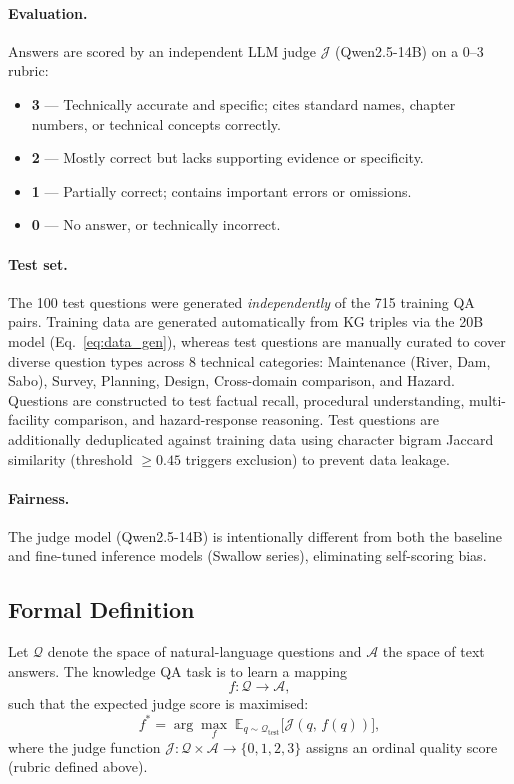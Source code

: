 \documentclass[twocolumn]{article}
\begin{document}
\paragraph{Evaluation.}
Answers are scored by an independent LLM judge $\mathcal{J}$ (Qwen2.5-14B) on a 0--3 rubric:
\begin{itemize}
  \item \textbf{3} --- Technically accurate and specific; cites standard names, chapter numbers,
        or technical concepts correctly.
  \item \textbf{2} --- Mostly correct but lacks supporting evidence or specificity.
  \item \textbf{1} --- Partially correct; contains important errors or omissions.
  \item \textbf{0} --- No answer, or technically incorrect.
\end{itemize}

\paragraph{Test set.}
The 100 test questions were generated \emph{independently} of the 715 training QA pairs.
Training data are generated automatically from KG triples via the 20B model
(Eq.~\ref{eq:data_gen}), whereas test questions are manually curated to cover
diverse question types across 8 technical categories:
Maintenance (River, Dam, Sabo), Survey, Planning, Design,
Cross-domain comparison, and Hazard.
Questions are constructed to test factual recall, procedural understanding,
multi-facility comparison, and hazard-response reasoning.
Test questions are additionally deduplicated against training data using character bigram Jaccard similarity
(threshold $\geq 0.45$ triggers exclusion) to prevent data leakage.

\paragraph{Fairness.}
The judge model (Qwen2.5-14B) is intentionally different from both the baseline and
fine-tuned inference models (Swallow series), eliminating self-scoring bias.

\subsection*{Formal Definition}

Let $\mathcal{Q}$ denote the space of natural-language questions and
$\mathcal{A}$ the space of text answers.
The knowledge QA task is to learn a mapping
\begin{equation}
  f : \mathcal{Q} \to \mathcal{A},
  \label{eq:task}
\end{equation}
such that the expected judge score is maximised:
\begin{equation}
  f^* = \arg\max_{f}\; \mathbb{E}_{q \sim \mathcal{Q}_{\mathrm{test}}}\bigl[\mathcal{J}(q,\, f(q))\bigr],
  \label{eq:objective}
\end{equation}
where the judge function $\mathcal{J}: \mathcal{Q}\times\mathcal{A}\to\{0,1,2,3\}$
assigns an ordinal quality score (rubric defined above).
\end{document}
